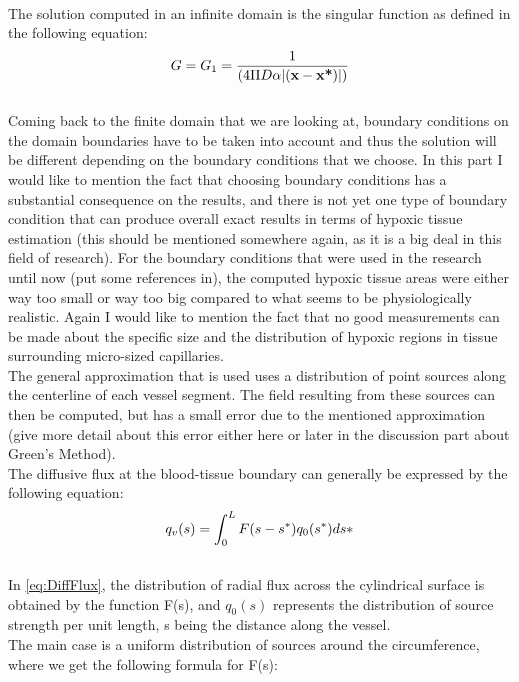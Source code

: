 %
\\The solution computed in an infinite domain is the singular function as defined in the following equation:
\begin{equation}
\\G = G_1 = \frac{1}{(4 \Pi D \alpha |( \textbf{x} - \textbf{x*} )|)}
\label{eq:InfDomainSol}
\end{equation}
%
\\Coming back to the finite domain that we are looking at, boundary conditions on the domain boundaries have to be taken into account and thus the solution will be different depending on the boundary conditions that we choose. In this part I would like to mention the fact that choosing boundary conditions has a substantial consequence on the results, and there is not yet one type of boundary condition that can produce overall exact results in terms of hypoxic tissue estimation (this should be mentioned somewhere again, as it is a big deal in this field of research). For the boundary conditions that were used in the research until now (put some references in), the computed hypoxic tissue areas were either way too small or way too big compared to what seems to be physiologically realistic. Again I would like to mention the fact that no good measurements can be made about the specific size and the distribution of hypoxic regions in tissue surrounding micro-sized capillaries.
\\The general approximation that is used uses a distribution of point sources along the centerline of each vessel segment. The field resulting from these sources can then be computed, but has a small error due to the mentioned approximation (give more detail about this error either here or later in the discussion part about Green's Method).
\\The diffusive flux at the blood-tissue boundary can generally be expressed by the following equation:
%
\begin{equation}
\\q_v(s) = \int_{0}^L F(s-s^*)q_0(s^*)ds*
\label{eq:DiffFlux}
\end{equation}
%
\\In \ref{eq:DiffFlux}, the distribution of radial flux across the cylindrical surface is obtained by the function F(s), and $q_0(s)$ represents the distribution of source strength per unit length, s being the distance along the vessel.
\\The main case is a uniform distribution of sources around the circumference, where we get the following formula for F(s):
